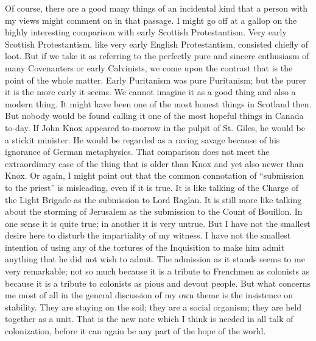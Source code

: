 \documentclass{book}
\begin{document}
Of course, there are a good many things of an incidental kind that a person with my views might comment on in that passage. I might go off at a gallop on the highly interesting comparison with early Scottish Protestantism. Very early Scottish Protestantism, like very early English Protestantism, consisted chiefly of loot. But if we take it as referring to the perfectly pure and sincere enthusiasm of many Covenanters or early Calvinists, we come upon the contrast that is the point of the whole matter. Early Puritanism was pure Puritanism; but the purer it is the more early it seems. We cannot imagine it as a good thing and also a modern thing. It might have been one of the most honest things in Scotland then. But nobody would be found calling it one of the most hopeful things in Canada to-day. If John Knox appeared to-morrow in the pulpit of St. Giles, he would be a stickit minister. He would be regarded as a raving savage because of his ignorance of German metaphysics. That comparison does not meet the extraordinary case of the thing that is older than Knox and yet also newer than Knox. Or again, I might point out that the common connotation of “submission to the priest” is misleading, even if it is true. It is like talking of the Charge of the Light Brigade as the submission to Lord Raglan. It is still more like talking about the storming of Jerusalem as the submission to the Count of Bouillon. In one sense it is quite true; in another it is very untrue. But I have not the smallest desire here to disturb the impartiality of my witness. I have not the smallest intention of using any of the tortures of the Inquisition to make him admit anything that he did not wish to admit. The admission as it stands seems to me very remarkable; not so much because it is a tribute to Frenchmen as colonists as because it is a tribute to colonists as pious and devout people. But what concerns me most of all in the general discussion of my own theme is the insistence on stability. They are staying on the soil; they are a social organism; they are held together as a unit. That is the new note which I think is needed in all talk of colonization, before it can again be any part of the hope of the world.
\end{document}

